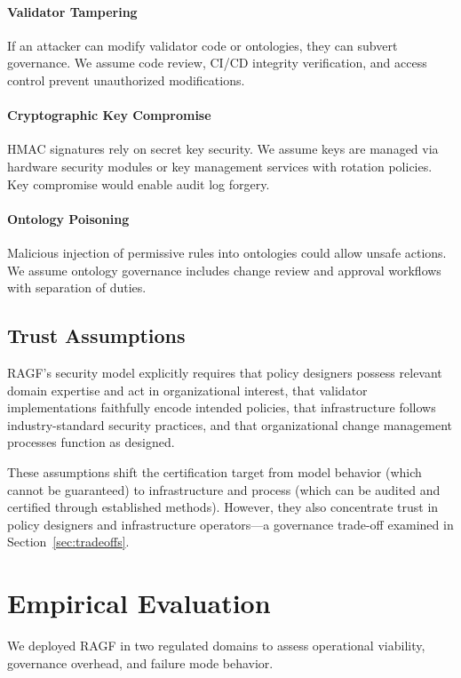 \documentclass[sigconf,nonacm]{acmart}
\begin{document}
\paragraph{Validator Tampering} If an attacker can modify validator code or ontologies, they can subvert governance. We assume code review, CI/CD integrity verification, and access control prevent unauthorized modifications.

\paragraph{Cryptographic Key Compromise} HMAC signatures rely on secret key security. We assume keys are managed via hardware security modules or key management services with rotation policies. Key compromise would enable audit log forgery.

\paragraph{Ontology Poisoning} Malicious injection of permissive rules into ontologies could allow unsafe actions. We assume ontology governance includes change review and approval workflows with separation of duties.

\subsection{Trust Assumptions}

RAGF's security model explicitly requires that policy designers possess relevant domain expertise and act in organizational interest, that validator implementations faithfully encode intended policies, that infrastructure follows industry-standard security practices, and that organizational change management processes function as designed.

These assumptions shift the certification target from model behavior (which cannot be guaranteed) to infrastructure and process (which can be audited and certified through established methods). However, they also concentrate trust in policy designers and infrastructure operators---a governance trade-off examined in Section~\ref{sec:tradeoffs}.

\section{Empirical Evaluation}

We deployed RAGF in two regulated domains to assess operational viability, governance overhead, and failure mode behavior.
\end{document}
